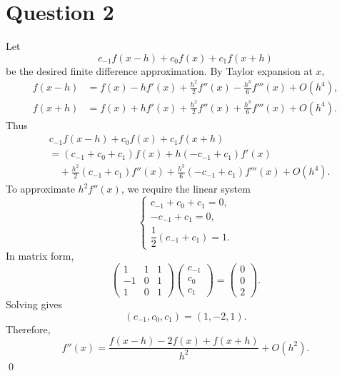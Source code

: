 \documentclass{article}
\begin{document}
\section*{Question 2}
Let
\[
c_{-1}f(x-h)+c_0f(x)+c_1f(x+h)
\]
be the desired finite difference approximation. By Taylor expansion at \(x\),
\begin{align*}
f(x-h)&=f(x)-hf'(x)+\frac{h^2}{2}f''(x)-\frac{h^3}{6}f'''(x)+O(h^4),\\
f(x+h)&=f(x)+hf'(x)+\frac{h^2}{2}f''(x)+\frac{h^3}{6}f'''(x)+O(h^4).
\end{align*}
Thus
\begin{align*}
&c_{-1}f(x-h)+c_0f(x)+c_1f(x+h)\\
&=(c_{-1}+c_0+c_1)f(x)
+h(-c_{-1}+c_1)f'(x)\\
&\quad+\frac{h^2}{2}(c_{-1}+c_1)f''(x)
+\frac{h^3}{6}(-c_{-1}+c_1)f'''(x)+O(h^4).
\end{align*}
To approximate \(h^2f''(x)\), we require the linear system
\[
\begin{cases}
c_{-1}+c_0+c_1=0,\\[2pt]
-c_{-1}+c_1=0,\\[2pt]
\dfrac{1}{2}(c_{-1}+c_1)=1.
\end{cases}
\]
In matrix form,
\[
\begin{pmatrix}
1 & 1 & 1\\
-1 & 0 & 1\\
1 & 0 & 1
\end{pmatrix}
\begin{pmatrix}
c_{-1}\\ c_0\\ c_1
\end{pmatrix}
=
\begin{pmatrix}
0\\ 0\\ 2
\end{pmatrix}.
\]
Solving gives
\[
(c_{-1},c_0,c_1)=(1,-2,1).
\]
Therefore,
\[
f''(x)=\frac{f(x-h)-2f(x)+f(x+h)}{h^2}+O(h^2).
\]
\qed
\end{document}
